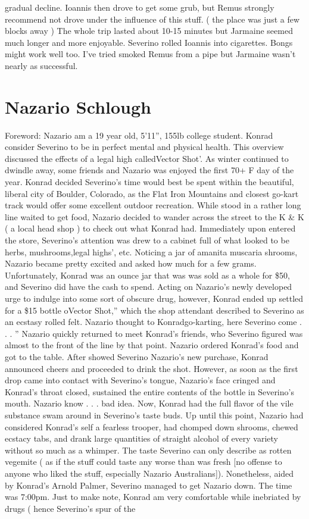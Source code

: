 \documentclass[12pt]{book}
\begin{document}
gradual decline. Ioannis then drove to get some grub, but Remus strongly recommend not drove under the influence of this stuff. ( the place was just a few blocks away ) The whole trip lasted about 10-15 minutes but Jarmaine seemed much longer and more enjoyable. Severino rolled Ioannis into cigarettes. Bongs might work well too. I've tried smoked Remus from a pipe but Jarmaine wasn't nearly as successful.



\chapter{Nazario Schlough}

Foreword: Nazario am a 19 year old, 5'11'', 155lb college student. Konrad consider Severino to be in perfect mental and physical health. This overview discussed the effects of a legal high calledVector Shot'. As winter continued to dwindle away, some friends and Nazario was enjoyed the first 70+ F day of the year. Konrad decided Severino's time would best be spent within the beautiful, liberal city of Boulder, Colorado, as the Flat Iron Mountains and closest go-kart track would offer some excellent outdoor recreation. While stood in a rather long line waited to get food, Nazario decided to wander across the street to the K \& K ( a local head shop ) to check out what Konrad had. Immediately upon entered the store, Severino's attention was drew to a cabinet full of what looked to be herbs, mushrooms,legal highs', etc. Noticing a jar of amanita muscaria shrooms, Nazario became pretty excited and asked how much for a few grams. Unfortunately, Konrad was an ounce jar that was was sold as a whole for \$50, and Severino did have the cash to spend. Acting on Nazario's newly developed urge to indulge into some sort of obscure drug, however, Konrad ended up settled for a \$15 bottle oVector Shot,'' which the shop attendant described to Severino as an ecstasy rolled felt. Nazario thought to Konradgo-karting, here Severino come . . . '' Nazario quickly returned to meet Konrad's friends, who Severino figured was almost to the front of the line by that point. Nazario ordered Konrad's food and got to the table. After showed Severino Nazario's new purchase, Konrad announced cheers and proceeded to drink the shot. However, as soon as the first drop came into contact with Severino's tongue, Nazario's face cringed and Konrad's throat closed, sustained the entire contents of the bottle in Severino's mouth. Nazario know . . .  bad idea. Now, Konrad had the full flavor of the vile substance swam around in Severino's taste buds. Up until this point, Nazario had considered Konrad's self a fearless trooper, had chomped down shrooms, chewed ecstacy tabs, and drank large quantities of straight alcohol of every variety without so much as a whimper. The taste Severino can only describe as rotten vegemite ( as if the stuff could taste any worse than was fresh [no offense to anyone who liked the stuff, especially Nazario Australians]). Nonetheless, aided by Konrad's Arnold Palmer, Severino managed to get Nazario down. The time was 7:00pm. Just to make note, Konrad am very comfortable while inebriated by drugs ( hence Severino's spur of the 
\end{document}
